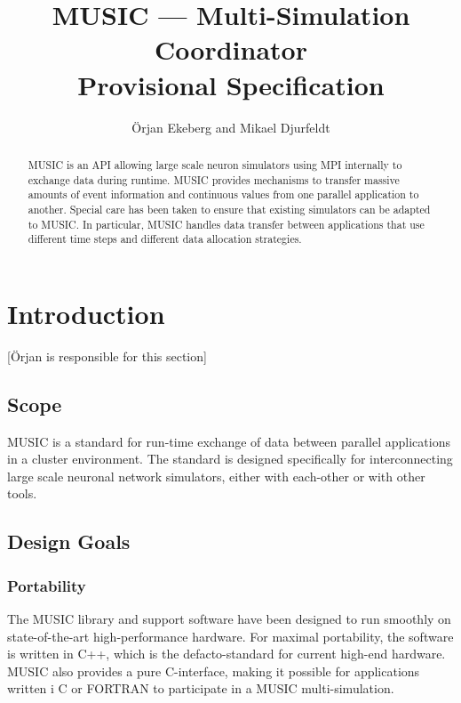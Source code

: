 \documentclass[a4paper]{report}
\newcommand{\responsible}[1]%
{{\color{red}[#1 is responsible for this section]}}
\begin{document}
\title{MUSIC --- Multi-Simulation Coordinator\\
  Provisional Specification}

\author{Örjan Ekeberg and Mikael Djurfeldt}

\maketitle

\begin{abstract}
  MUSIC is an API allowing large scale neuron simulators using MPI
  internally to exchange data during runtime.  MUSIC provides
  mechanisms to transfer massive amounts of event information and
  continuous values from one parallel application to another.  Special
  care has been taken to ensure that existing simulators can be
  adapted to MUSIC.  In particular, MUSIC handles data transfer
  between applications that use different time steps and different
  data allocation strategies.
\end{abstract}


\tableofcontents

\chapter{Introduction}

\responsible{Örjan}

\section{Scope}

MUSIC is a standard for run-time exchange of data between parallel
applications in a cluster environment.  The standard is designed
specifically for interconnecting large scale neuronal network
simulators, either with each-other or with other tools.


\section{Design Goals}

\subsection{Portability}

The MUSIC library and support software have been designed to run
smoothly on state-of-the-art high-performance hardware.  For maximal
portability, the software is written in C++, which is the
defacto-standard for current high-end hardware.  MUSIC also provides a
pure C-interface, making it possible for applications written i C or
FORTRAN to participate in a MUSIC multi-simulation.
\end{document}
